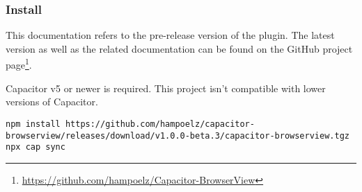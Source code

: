 \subsubsection{Install}
\label{sec:Capacitor-BrowserView:Install}

This documentation refers to the pre-release version  of the plugin.
The latest version as well as the related documentation can be found on the GitHub project page\footnote{\url{https://github.com/hampoelz/Capacitor-BrowserView}}.

Capacitor v5 or newer is required. This project isn't compatible with lower versions of Capacitor.

\begin{verbatim}
npm install https://github.com/hampoelz/capacitor-browserview/releases/download/v1.0.0-beta.3/capacitor-browserview.tgz
npx cap sync
\end{verbatim}
